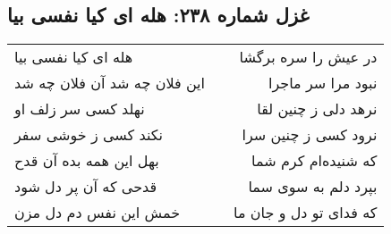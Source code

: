 \begin{center}
\section*{غزل شماره ۲۳۸: هله ای کیا نفسی بیا}
\label{sec:0238}
\begin{longtable}{l p{0.5cm} r}
هله ای کیا نفسی بیا
&&
در عیش را سره برگشا
\\
این فلان چه شد آن فلان چه شد
&&
نبود مرا سر ماجرا
\\
نهلد کسی سر زلف او
&&
نرهد دلی ز چنین لقا
\\
نکند کسی ز خوشی سفر
&&
نرود کسی ز چنین سرا
\\
بهل این همه بده آن قدح
&&
که شنیده‌ام کرم شما
\\
قدحی که آن پر دل شود
&&
بپرد دلم به سوی سما
\\
خمش این نفس دم دل مزن
&&
که فدای تو دل و جان ما
\\
\end{longtable}
\end{center}
